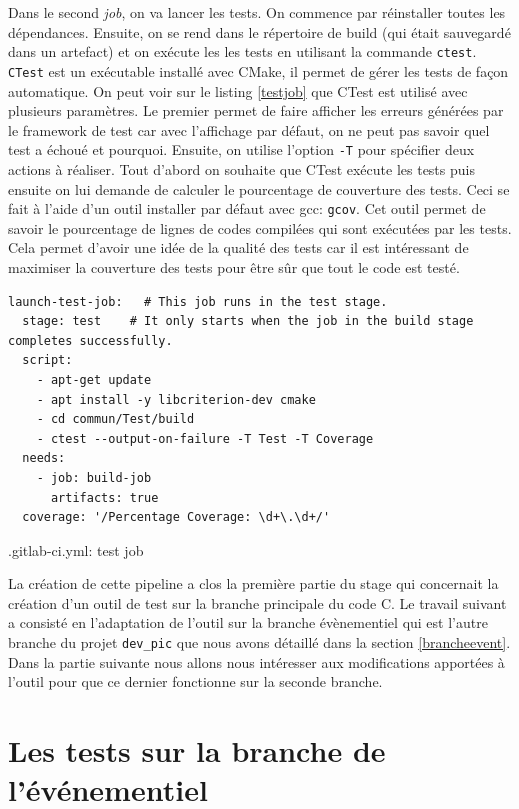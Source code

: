 \documentclass[a4paper]{article}
\begin{document}
Dans le second \textit{job}, on va lancer les tests. On commence par réinstaller
toutes les dépendances. Ensuite, on se rend dans le répertoire de build (qui
était sauvegardé dans un artefact) et on exécute les les tests en utilisant la
commande \verb|ctest|. \verb|CTest| est un exécutable installé avec CMake, il
permet de gérer les tests de façon automatique. On peut voir sur le listing
\ref{testjob} que CTest est utilisé avec plusieurs paramètres. Le premier permet
de faire afficher les erreurs générées par le framework de test car avec
l'affichage par défaut, on ne peut pas savoir quel test a échoué et pourquoi.
Ensuite, on utilise l'option \verb|-T| pour spécifier deux actions à réaliser.
Tout d'abord on souhaite que CTest exécute les tests puis ensuite on lui demande
de calculer le pourcentage de couverture des tests. Ceci se fait à l'aide d'un
outil installer par défaut avec gcc: \verb|gcov|. Cet outil permet de savoir le
pourcentage de lignes de codes compilées qui sont exécutées par les tests. Cela
permet d'avoir une idée de la qualité des tests car il est intéressant de
maximiser la couverture des tests pour être sûr que tout le code est testé.

\begin{listing}[ht!]
\begin{verbatim}
launch-test-job:   # This job runs in the test stage.
  stage: test    # It only starts when the job in the build stage completes successfully.
  script:
    - apt-get update
    - apt install -y libcriterion-dev cmake
    - cd commun/Test/build
    - ctest --output-on-failure -T Test -T Coverage
  needs:
    - job: build-job
      artifacts: true
  coverage: '/Percentage Coverage: \d+\.\d+/'
\end{verbatim}
\caption{.gitlab-ci.yml: test job}
\label{testjob}
\end{listing}

La création de cette pipeline a clos la première partie du stage qui concernait
la création d'un outil de test sur la branche principale du code C. Le travail
suivant a consisté en l'adaptation de l'outil sur la branche évènementiel qui
est l'autre branche du projet \verb|dev_pic| que nous avons détaillé dans la
section \ref{brancheevent}. Dans la partie suivante nous allons nous intéresser
aux modifications apportées à l'outil pour que ce dernier fonctionne sur la
seconde branche.
\section{Les tests sur la branche de l'événementiel}%
\end{document}
